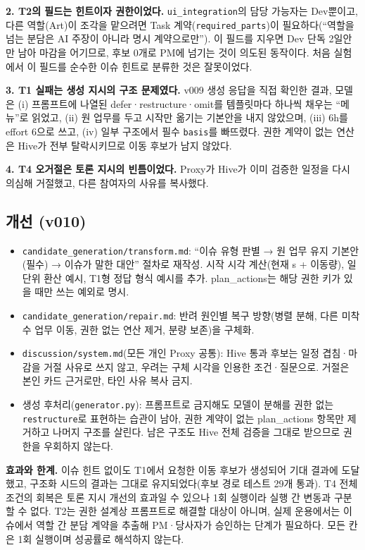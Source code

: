 \documentclass[11pt,a4paper]{article}
\begin{document}
\textbf{2. T2의 필드는 힌트이자 권한이었다.} \texttt{ui\_integration}의 담당 가능자는 Dev뿐이고, 다른 역할(Art)이 조각을 맡으려면 Task 계약(\texttt{required\_parts})이 필요하다(``역할을 넘는 분담은 AI 주장이 아니라 명시 계약으로만''). 이 필드를 지우면 Dev 단독 2일안만 남아 마감을 어기므로, 후보 0개로 PM에 넘기는 것이 의도된 동작이다. 처음 실험에서 이 필드를 순수한 이슈 힌트로 분류한 것은 잘못이었다.

\textbf{3. T1 실패는 생성 지시의 구조 문제였다.} v009 생성 응답을 직접 확인한 결과, 모델은 (i) 프롬프트에 나열된 defer·restructure·omit를 템플릿마다 하나씩 채우는 ``메뉴''로 읽었고, (ii) 원 업무를 두고 시작만 옮기는 기본안을 내지 않았으며, (iii) 6h를 effort 6으로 쓰고, (iv) 일부 구조에서 필수 \texttt{basis}를 빠뜨렸다. 권한 계약이 없는 연산은 Hive가 전부 탈락시키므로 이동 후보가 남지 않았다.

\textbf{4. T4 오거절은 토론 지시의 빈틈이었다.} Proxy가 Hive가 이미 검증한 일정을 다시 의심해 거절했고, 다른 참여자의 사유를 복사했다.

\subsection{개선 (v010)}
\begin{itemize}
\item \texttt{candidate\_generation/transform.md}: ``이슈 유형 판별 → 원 업무 유지 기본안(필수) → 이슈가 말한 대안'' 절차로 재작성. 시작 시각 계산(현재 s + 이동량), 일 단위 환산 예시, T1형 정답 형식 예시를 추가. plan\_actions는 해당 권한 키가 있을 때만 쓰는 예외로 명시.
\item \texttt{candidate\_generation/repair.md}: 반려 원인별 복구 방향(병렬 분해, 다른 미착수 업무 이동, 권한 없는 연산 제거, 분량 보존)을 구체화.
\item \texttt{discussion/system.md}(모든 개인 Proxy 공통): Hive 통과 후보는 일정 겹침·마감을 거절 사유로 쓰지 않고, 우려는 구체 시각을 인용한 조건·질문으로. 거절은 본인 카드 근거로만, 타인 사유 복사 금지.
\item 생성 후처리(\texttt{generator.py}): 프롬프트로 금지해도 모델이 분해를 권한 없는 \texttt{restructure}로 표현하는 습관이 남아, 권한 계약이 없는 plan\_actions 항목만 제거하고 나머지 구조를 살린다. 남은 구조도 Hive 전체 검증을 그대로 받으므로 권한을 우회하지 않는다.
\end{itemize}

\textbf{효과와 한계.} 이슈 힌트 없이도 T1에서 요청한 이동 후보가 생성되어 기대 결과에 도달했고, 구조화 시드의 결과는 그대로 유지되었다(후보 경로 테스트 29개 통과). T4 전체 조건의 회복은 토론 지시 개선의 효과일 수 있으나 1회 실행이라 실행 간 변동과 구분할 수 없다. T2는 권한 설계상 프롬프트로 해결할 대상이 아니며, 실제 운용에서는 이슈에서 역할 간 분담 계약을 추출해 PM·당사자가 승인하는 단계가 필요하다. 모든 칸은 1회 실행이며 성공률로 해석하지 않는다.
\end{document}
